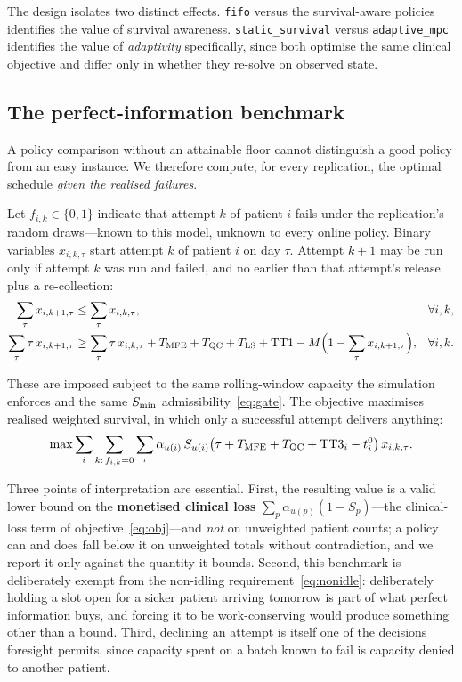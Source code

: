 The design isolates two distinct effects. \texttt{fifo} versus the
survival-aware policies identifies the value of survival awareness.
\texttt{static\_survival} versus \texttt{adaptive\_mpc} identifies the value of
\emph{adaptivity} specifically, since both optimise the same clinical objective
and differ only in whether they re-solve on observed state.

\subsection{The perfect-information benchmark}
\label{sec:bound}

A policy comparison without an attainable floor cannot distinguish a good
policy from an easy instance. We therefore compute, for every replication, the
optimal schedule \emph{given the realised failures}.

Let $f_{i,k} \in \{0,1\}$ indicate that attempt $k$ of patient $i$ fails under
the replication's random draws---known to this model, unknown to every online
policy. Binary variables $x_{i,k,\tau}$ start attempt $k$ of patient $i$ on day
$\tau$. Attempt $k+1$ may be run only if attempt $k$ was run and failed, and no
earlier than that attempt's release plus a re-collection:
\begin{align}
  \sum_{\tau} x_{i,k+1,\tau} &\le \sum_{\tau} x_{i,k,\tau}, & &\forall i,k,
      \label{eq:pi1}\\
  \sum_{\tau} \tau\,x_{i,k+1,\tau} &\ge \sum_{\tau} \tau\,x_{i,k,\tau}
      + T_{\mathrm{MFE}} + T_{\mathrm{QC}} + T_{\mathrm{LS}} + \mathrm{TT1}
      - M\Bigl(1 - \sum_{\tau} x_{i,k+1,\tau}\Bigr), & &\forall i,k.
      \label{eq:pi2}
\end{align}

These are imposed subject to the same rolling-window capacity the simulation
enforces and the same $S_{\min}$ admissibility~\eqref{eq:gate}. The objective
maximises realised weighted survival, in which only a successful attempt
delivers anything:
\begin{equation}
  \max \sum_{i} \sum_{k:\, f_{i,k}=0} \sum_{\tau}
    \alpha_{u(i)}\, S_{u(i)}\bigl(\tau + T_{\mathrm{MFE}} + T_{\mathrm{QC}} + \mathrm{TT3}_i - t^{0}_{i}\bigr)
    \, x_{i,k,\tau}. \label{eq:piobj}
\end{equation}

Three points of interpretation are essential. First, the resulting value is a
valid lower bound on the \textbf{monetised clinical loss} $\sum_p
\alpha_{u(p)}(1 - S_p)$---the clinical-loss term of objective~\eqref{eq:obj}---and
\emph{not} on unweighted patient counts; a policy can and does fall below it on
unweighted totals without contradiction, and we report it only against the
quantity it bounds. Second, this benchmark is deliberately exempt from the
non-idling requirement~\eqref{eq:nonidle}: deliberately holding a slot open for
a sicker patient arriving tomorrow is part of what perfect information buys, and
forcing it to be work-conserving would produce something other than a bound.
Third, declining an attempt is itself one of the decisions foresight permits,
since capacity spent on a batch known to fail is capacity denied to another
patient.

